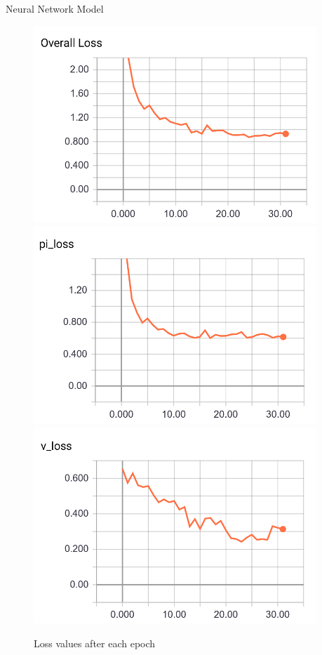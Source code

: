 \documentclass[final]{beamer}
\newlength{\onecolwid}
\newlength{\twocolwid}
\begin{document}
\begin{frame}[t]
\begin{columns}[t]
\begin{column}{\twocolwid}
\begin{columns}[t,totalwidth=\twocolwid]
\begin{column}{\onecolwid}
\begin{column}{\onecolwid}
\begin{block}{Neural Network Model}
\begin{figure}
\includegraphics[width=0.3\linewidth]{overall_loss.png}
\includegraphics[width=0.3\linewidth]{pi_loss.png}
\includegraphics[width=0.3\linewidth]{value_loss.png}
\caption{Loss values after each epoch}
\end{figure}


\end{block}


\end{column} %


\end{column} %

\begin{column}{\onecolwid}\vspace{-.6in} %

\begin{column}{\onecolwid} %



\end{column}
\end{column}
\end{columns}
\end{column}
\end{columns}
\end{frame}
\end{document}
